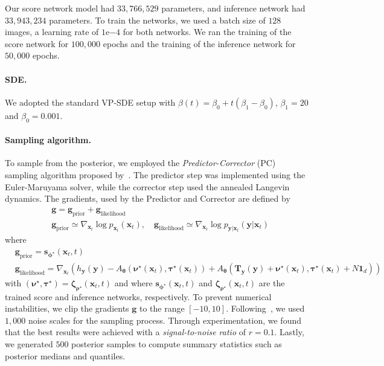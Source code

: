 Our score network model had $33,766,529$ parameters, and inference network had $33,943,234$ parameters. To train the networks, we used a batch size of $128$ images, a learning rate of $1\text{e}{-4}$ for both networks. We ran the training of the score network for $100,000$ epochs and the training of the inference network for $50,000$ epochs.


\paragraph{SDE.}
We adopted the standard VP-SDE setup with $\beta(t) = \beta_0 + t (\beta_1 - \beta_0)$, $\beta_1 = 20$ and $\beta_0 = 0.001$.

\paragraph{Sampling algorithm.}
To sample from the posterior, we employed the \textit{Predictor-Corrector} (PC) sampling algorithm proposed by~\citet[Algorithm 1, 3, 5]{song2021scorebased}. The predictor step was implemented using the Euler-Maruyama solver, while the corrector step used the annealed Langevin dynamics. The gradients, used by the Predictor and Corrector are defined by
\begin{align*}
&\mathbf{g} = \mathbf{g}_{\text{prior}} + \mathbf{g}_{\text{likelihood}} \\
&\mathbf{g}_{\text{prior}} \simeq \nabla_{\mathbf{x}_t}  \log p_{\mathbf{x}_t}(\mathbf{x}_t), \quad \mathbf{g}_{\text{likelihood}} \simeq \nabla_{\mathbf{x}_t} \log p_{\mathbf{y}|\mathbf{x}_t}(\mathbf{y}|\mathbf{x}_{t})
\end{align*}
where 
\begin{align*}
&\mathbf{g}_{\text{prior}} = \mathbf{s}_{\boldsymbol{\phi}^\star}(\mathbf{x}_t, t) \label{eq:gradient_sampling} \\
& \mathbf{g}_{\text{likelihood}}  = \nabla_{\mathbf{x}_t} \left(h_{\mathbf{y}}(\mathbf{y}) - A_{\boldsymbol{\theta}}(\boldsymbol{\nu}^\star(\mathbf{x}_t), \boldsymbol{\tau}^\star(\mathbf{x}_t)) + A_{\boldsymbol{\theta}}(\mathbf{T}_{\mathbf{y}}(\mathbf{y}) + \boldsymbol{\nu}^\star(\mathbf{x}_t), \boldsymbol{\tau}^\star(\mathbf{x}_t) + N \mathbf{1}_d)\right)
\end{align*}
with $(\boldsymbol{\nu}^\star, \boldsymbol{\tau}^\star) = \boldsymbol{\zeta}_{\boldsymbol{\rho}^\star}(\mathbf{x}_t, t)$ and where $\mathbf{s}_{\boldsymbol{\phi}^\star}(\mathbf{x}_t, t)$ and $\boldsymbol{\zeta}_{\boldsymbol{\rho}^\star}(\mathbf{x}_t, t)$ are the trained score and inference networks, respectively. To prevent numerical instabilities, we clip the gradients $\mathbf{g}$ to the range $[-10,10]$.
Following~\citet{song2021scorebased}, we used $1,000$ noise scales for the sampling process. Through experimentation, we found that the best results were achieved with a \textit{signal-to-noise ratio} of $r = 0.1$. 
Lastly, we generated $500$ posterior samples to compute summary statistics such as posterior medians and quantiles.


